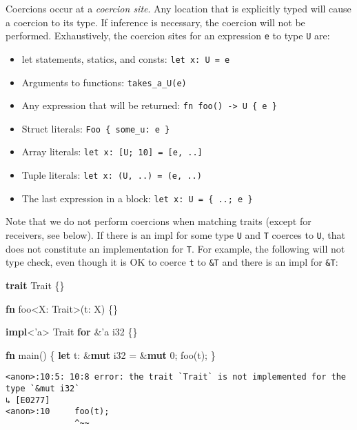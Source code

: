 \documentclass[a4paper,]{book}
\newenvironment{Shaded}{\begin{snugshade}}{\end{snugshade}}
\newcommand{\KeywordTok}[1]{\textcolor[rgb]{0.13,0.29,0.53}{\textbf{{#1}}}}
\newcommand{\DataTypeTok}[1]{\textcolor[rgb]{0.13,0.29,0.53}{{#1}}}
\newcommand{\DecValTok}[1]{\textcolor[rgb]{0.00,0.00,0.81}{{#1}}}
\newcommand{\OtherTok}[1]{\textcolor[rgb]{0.56,0.35,0.01}{{#1}}}
\newcommand{\NormalTok}[1]{{#1}}
\providecommand{\tightlist}{%
  \setlength{\itemsep}{0pt}\setlength{\parskip}{0pt}}
\begin{document}
Coercions occur at a \emph{coercion site}. Any location that is
explicitly typed will cause a coercion to its type. If inference is
necessary, the coercion will not be performed. Exhaustively, the
coercion sites for an expression \texttt{e} to type \texttt{U} are:

\begin{itemize}
\tightlist
\item
  let statements, statics, and consts: \texttt{let\ x:\ U\ =\ e}
\item
  Arguments to functions: \texttt{takes\_a\_U(e)}
\item
  Any expression that will be returned:
  \texttt{fn\ foo()\ -\textgreater{}\ U\ \{\ e\ \}}
\item
  Struct literals: \texttt{Foo\ \{\ some\_u:\ e\ \}}
\item
  Array literals: \texttt{let\ x:\ {[}U;\ 10{]}\ =\ {[}e,\ ..{]}}
\item
  Tuple literals: \texttt{let\ x:\ (U,\ ..)\ =\ (e,\ ..)}
\item
  The last expression in a block: \texttt{let\ x:\ U\ =\ \{\ ..;\ e\ \}}
\end{itemize}

Note that we do not perform coercions when matching traits (except for
receivers, see below). If there is an impl for some type \texttt{U} and
\texttt{T} coerces to \texttt{U}, that does not constitute an
implementation for \texttt{T}. For example, the following will not type
check, even though it is OK to coerce \texttt{t} to \texttt{\&T} and
there is an impl for \texttt{\&T}:

\begin{Shaded}
\begin{Highlighting}[]
\KeywordTok{trait} \NormalTok{Trait \{\}}

\KeywordTok{fn} \NormalTok{foo<X: Trait>(t: X) \{\}}

\KeywordTok{impl}\NormalTok{<}\OtherTok{'a}\NormalTok{> Trait }\KeywordTok{for} \NormalTok{&}\OtherTok{'a} \DataTypeTok{i32} \NormalTok{\{\}}


\KeywordTok{fn} \NormalTok{main() \{}
    \KeywordTok{let} \NormalTok{t: &}\KeywordTok{mut} \DataTypeTok{i32} \NormalTok{= &}\KeywordTok{mut} \DecValTok{0}\NormalTok{;}
    \NormalTok{foo(t);}
\NormalTok{\}}
\end{Highlighting}
\end{Shaded}

\begin{verbatim}
<anon>:10:5: 10:8 error: the trait `Trait` is not implemented for the type `&mut i32` 
↳ [E0277]
<anon>:10     foo(t);
              ^~~
\end{verbatim}
\end{document}
